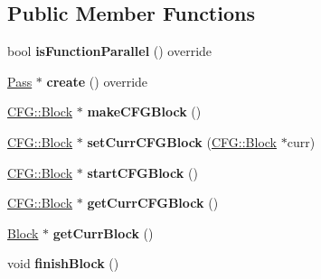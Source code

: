 \subsection*{Public Member Functions}
\begin{DoxyCompactItemize}
\item 
\mbox{\label{structwasm_1_1_re_reloop_a24153538e6f1ae855458b334c4e8e274}} 
bool {\bfseries is\+Function\+Parallel} () override
\item 
\mbox{\label{structwasm_1_1_re_reloop_ab905440e914166dc224d02347cde17f7}} 
\mbox{\hyperlink{classwasm_1_1_pass}{Pass}} $\ast$ {\bfseries create} () override
\item 
\mbox{\label{structwasm_1_1_re_reloop_a7dd7954015c01d89df99c65d85973d3c}} 
\mbox{\hyperlink{struct_c_f_g_1_1_block}{C\+F\+G\+::\+Block}} $\ast$ {\bfseries make\+C\+F\+G\+Block} ()
\item 
\mbox{\label{structwasm_1_1_re_reloop_ac8b6b1915ad21f3ec4c1c33ef783358f}} 
\mbox{\hyperlink{struct_c_f_g_1_1_block}{C\+F\+G\+::\+Block}} $\ast$ {\bfseries set\+Curr\+C\+F\+G\+Block} (\mbox{\hyperlink{struct_c_f_g_1_1_block}{C\+F\+G\+::\+Block}} $\ast$curr)
\item 
\mbox{\label{structwasm_1_1_re_reloop_a137fcd45f6f6f7cf9f431d32c8f5ba46}} 
\mbox{\hyperlink{struct_c_f_g_1_1_block}{C\+F\+G\+::\+Block}} $\ast$ {\bfseries start\+C\+F\+G\+Block} ()
\item 
\mbox{\label{structwasm_1_1_re_reloop_ae38f4c6eb474d6b650d9bdd366f6d07c}} 
\mbox{\hyperlink{struct_c_f_g_1_1_block}{C\+F\+G\+::\+Block}} $\ast$ {\bfseries get\+Curr\+C\+F\+G\+Block} ()
\item 
\mbox{\label{structwasm_1_1_re_reloop_a7ffd1f4dd338e4dee66e58894ae041bd}} 
\mbox{\hyperlink{classwasm_1_1_block}{Block}} $\ast$ {\bfseries get\+Curr\+Block} ()
\item 
\mbox{\label{structwasm_1_1_re_reloop_a32c9edee7afa41a8e250bcd69e884288}} 
void {\bfseries finish\+Block} ()
\item 

\end{DoxyCompactItemize}
